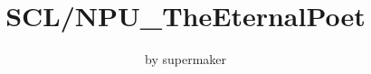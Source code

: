 \documentclass[a4paper]{article}
\begin{document}
\title{\Large \bf SCL/NPU_TheEternalPoet}
\author{by supermaker}

\maketitle

\begin{multicols*}{2}
\tableofcontents
\end{multicols*}

\clearpage

\columnseprule=0pt
\fontsize{7pt}{9pt}
\selectfont

\setcounter{page}{1}
\begin{multicols*}{2}

\end{multicols*}
\end{document}
